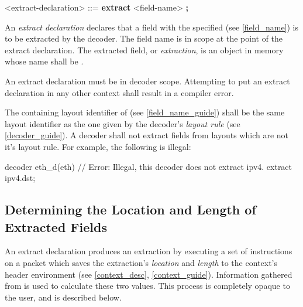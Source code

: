 \begin{grammar}
<extract-declaration> ::=
\textbf{extract} <field-name> \textbf{;}
\end{grammar}

An \textit{extract declaration} declares that a field with the specified  (see \ref{field_name}) is to be extracted by the decoder. The field name is in scope at the point of the extract declaration. The extracted field, or \textit{extraction}, is an object in memory whose name shall be .

An extract declaration must be in decoder scope. Attempting to put an extract declaration in any other context shall result in a compiler error.

The containing layout identifier of  (see \ref{field_name_guide}) shall be the same layout identifier as the one given by the decoder's \textit{layout rule} (see \ref{decoder_guide}). A decoder shall not extract fields from layouts which are not it's layout rule. For example, the following is illegal:

\begin{code}
decoder eth_d(eth) {
	// Error: Illegal, this decoder does not extract ipv4.
	extract ipv4.dst; 
}
\end{code}

\subsection{Determining the Location and Length of Extracted Fields}

An extract declaration produces an extraction by executing a set of instructions on a packet which saves the extraction's \textit{location} and \textit{length} to the context's header environment (see \ref{context_desc}, \ref{context_guide}). Information gathered from  is used to calculate these two values. This process is completely opaque to the user, and is described below.

